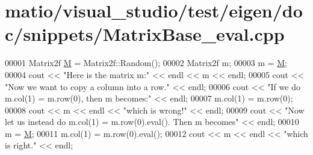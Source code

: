 \hypertarget{matio_2visual__studio_2test_2eigen_2doc_2snippets_2_matrix_base__eval_8cpp_source}{}\section{matio/visual\+\_\+studio/test/eigen/doc/snippets/\+Matrix\+Base\+\_\+eval.cpp}
\label{matio_2visual__studio_2test_2eigen_2doc_2snippets_2_matrix_base__eval_8cpp_source}

\begin{DoxyCode}
00001 Matrix2f \hyperlink{group___core___module_class_eigen_1_1_matrix}{M} = Matrix2f::Random();
00002 Matrix2f m;
00003 m = \hyperlink{group___core___module_class_eigen_1_1_matrix}{M};
00004 cout << \textcolor{stringliteral}{"Here is the matrix m:"} << endl << m << endl;
00005 cout << \textcolor{stringliteral}{"Now we want to copy a column into a row."} << endl;
00006 cout << \textcolor{stringliteral}{"If we do m.col(1) = m.row(0), then m becomes:"} << endl;
00007 m.col(1) = m.row(0);
00008 cout << m << endl << \textcolor{stringliteral}{"which is wrong!"} << endl;
00009 cout << \textcolor{stringliteral}{"Now let us instead do m.col(1) = m.row(0).eval(). Then m becomes"} << endl;
00010 m = \hyperlink{group___core___module_class_eigen_1_1_matrix}{M};
00011 m.col(1) = m.row(0).eval();
00012 cout << m << endl << \textcolor{stringliteral}{"which is right."} << endl;
\end{DoxyCode}
